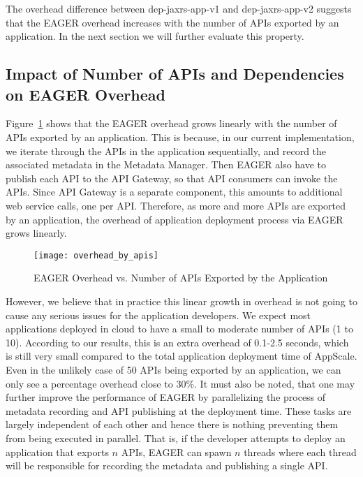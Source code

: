 The overhead difference between dep-jaxrs-app-v1 and dep-jaxrs-app-v2 suggests that the EAGER overhead increases with the number
of APIs exported by an application. In the next section we will further evaluate this property.

\subsection{Impact of Number of APIs and Dependencies on EAGER Overhead}

Figure~\ref{fig:overhead_by_apis} shows that the EAGER overhead grows linearly with the number of APIs exported by an application.
This is because, in our current implementation, we iterate through the APIs in the application sequentially, and record the associated metadata in the
Metadata Manager. Then EAGER also have to publish each API to the API Gateway, so that API consumers can invoke the APIs. Since
API Gateway is a separate component, this amounts to additional web service calls, one per API. Therefore, as more and more APIs are exported 
by an application, the overhead of application deployment process via EAGER grows linearly. 

\begin{figure}
\centering
\texttt{[image: overhead\_by\_apis]}
\caption{EAGER Overhead vs. Number of APIs Exported by the Application}
\label{fig:overhead_by_apis}
\end{figure}

However, we believe that in practice this linear growth in overhead is not going to cause any serious issues for the application developers.
We expect most applications deployed in cloud to have a small to moderate number of APIs (1 to 10). According to our results, this is an 
extra overhead of 0.1-2.5 seconds, which is still very small compared to the total application deployment time of AppScale. Even in the
unlikely case of 50 APIs being exported by an application, we can only see a percentage overhead close to 30\%. It must also be noted, that
one may further improve the performance of EAGER by parallelizing the process of metadata recording and API publishing at the deployment
time. These tasks are largely independent of each other and hence there is nothing preventing them from being executed in parallel. That is,
if the developer attempts to deploy an application that exports $n$ APIs, EAGER can spawn $n$ threads where each thread will be responsible
for recording the metadata and publishing a single API.

